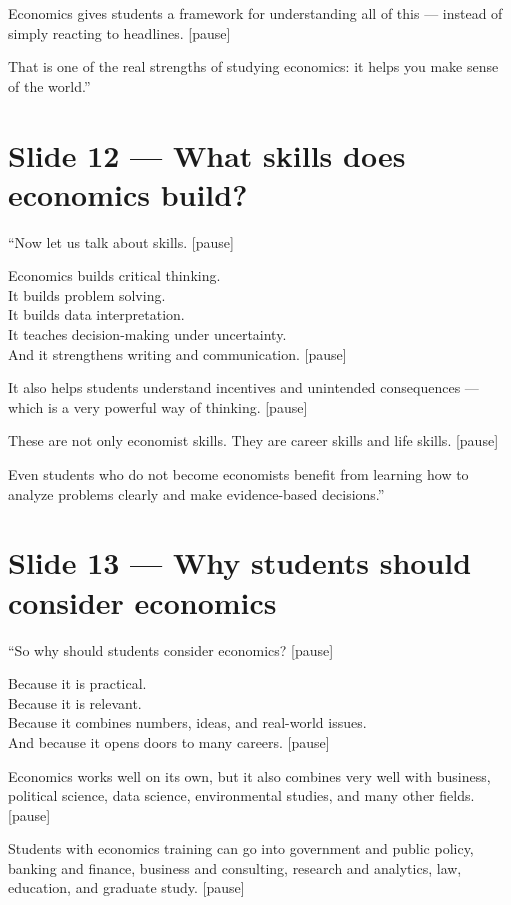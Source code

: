 \documentclass[12pt]{article}
\begin{document}
Economics gives students a framework for understanding all of this --- instead of simply reacting to headlines. [pause]

That is one of the real strengths of studying economics: it helps you make sense of the world.''

\section*{Slide 12 --- What skills does economics build?}

``Now let us talk about skills. [pause]

Economics builds critical thinking.\\
It builds problem solving.\\
It builds data interpretation.\\
It teaches decision-making under uncertainty.\\
And it strengthens writing and communication. [pause]

It also helps students understand incentives and unintended consequences --- which is a very powerful way of thinking. [pause]

These are not only economist skills. They are career skills and life skills. [pause]

Even students who do not become economists benefit from learning how to analyze problems clearly and make evidence-based decisions.''
\newpage
\section*{Slide 13 --- Why students should consider economics}

``So why should students consider economics? [pause]

Because it is practical.\\
Because it is relevant.\\
Because it combines numbers, ideas, and real-world issues.\\
And because it opens doors to many careers. [pause]

Economics works well on its own, but it also combines very well with business, political science, data science, environmental studies, and many other fields. [pause]

Students with economics training can go into government and public policy, banking and finance, business and consulting, research and analytics, law, education, and graduate study. [pause]
\end{document}
